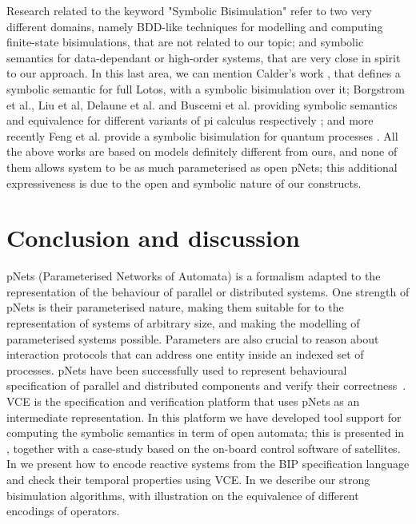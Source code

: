 \documentclass{elsarticle}
\begin{document}
Research related to the keyword "Symbolic Bisimulation" refer to two very different domains, namely BDD-like techniques for modelling and computing finite-state bisimulations, that are not related to our topic; and symbolic semantics for data-dependant or high-order systems, that are very close in spirit to our approach. In this last area, we can mention
Calder's work \cite{calder2001symbolic}, that  defines a symbolic semantic for full Lotos, with a symbolic bisimulation over it;
Borgstrom et al., Liu et al, Delaune et al. and Buscemi et al. providing symbolic semantics and equivalence for different variants of pi calculus respectively \cite{BorgstromBN04,DelauneKR:2007,LiuL:2010,BuscemiM:2008}; and more recently
 Feng et al. provide a symbolic bisimulation for quantum processes \cite{feng2014symbolic}.
All the above works are based on models  definitely different from ours, and none of them allows system to be as much parameterised as open pNets; this additional expressiveness is due to the open and symbolic nature of our constructs.



\section{Conclusion and discussion}
\label{section:conclusion}
 pNets (Parameterised Networks of Automata) is a formalism adapted to the representation of the behaviour of parallel or distributed systems. One  strength of pNets is their parameterised nature, making them suitable for to the representation of systems of arbitrary size, and making the modelling of parameterised systems possible. Parameters are also crucial to reason about interaction protocols that can address one entity inside an indexed set of processes. pNets have been successfully used to represent behavioural specification of parallel and distributed components and verify their correctness~\cite{AmeurBoulifa2017,HenrioKSM:2016}. VCE is the specification and verification platform that uses pNets as an intermediate representation.
{In this platform we have developed tool support for computing the
symbolic semantics in term of open automata; this is presented in \cite{QBMZ-AVOCS18,qin:hal-01823507}, together with a case-study based on the on-board control software of satellites.
In \cite{bliudze:hal-02143782} we present how to encode reactive systems from the BIP specification language and check their temporal properties using VCE.
In \cite{hou:hal-02406098,hou:hal-02376147} we describe our strong bisimulation algorithms, with illustration on the equivalence of different encodings of operators.
}
\end{document}
